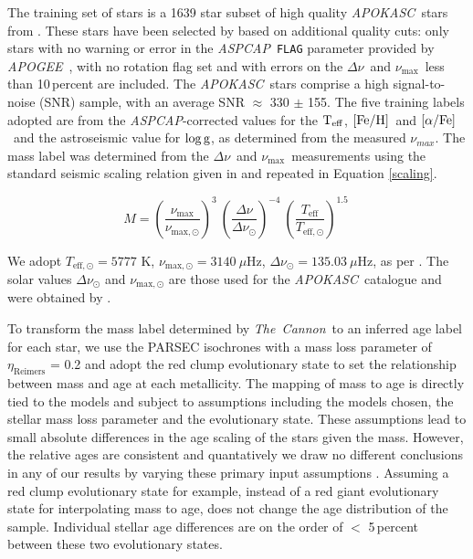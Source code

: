 \documentclass[12pt, preprint]{aastex}
\newcommand{\project}[1]{\textsl{#1}}
\newcommand{\tc}{\project{The~Cannon}}
\newcommand{\apogee}{\project{APOGEE}}
\newcommand{\apokasc}{\project{APOKASC}}
\newcommand{\aspcap}{\project{ASPCAP}}
\newcommand{\code}[1]{\texttt{#1}}
\newcommand{\teff}{\mbox{$\rm T_{eff}$}}
\newcommand{\feh}{\mbox{$\rm [Fe/H]$}}
\newcommand{\alphafe}{\mbox{$\rm [\alpha/Fe]$}}
\newcommand{\logg}{\mbox{$\rm \log g$}}
\newcommand{\numax}{$\nu_{\max}$}
\newcommand{\deltanu}{$\Delta\nu$}
\begin{document}
The training set of stars is a 1639 star subset of high quality \apokasc\ stars from \citet{Martig2014}. These stars have been selected by \citet{Martig2014} based on additional quality cuts: only stars with no warning or error in the \aspcap\ \code{FLAG} parameter provided by \apogee\ \citep{Ahn2014}, with no rotation flag set and with errors on the \deltanu\ and \numax\ less than 10\,percent are included. The \apokasc\ stars comprise a high signal-to-noise (SNR) sample, with an average SNR $\approx$ 330 $\pm$ 155. 
%
 The five training labels adopted are from the \aspcap-corrected \citep{Meszaros2013} values for the \teff, \feh\ and \alphafe\ and the astroseismic value for \logg, as determined from the measured $\nu_{max}$. The mass label was determined from the  \deltanu\ and \numax\ measurements using the standard seismic scaling relation given in \citet{SilvaA2011,Chaplin2011} and repeated in Equation \ref{scaling}.

\begin{equation} \label{eq:mass}
M= \left( \frac{\nu_{\mathrm{max}}}{\nu_{\mathrm{max,\odot}}}\right)^3\  \left( \frac{\Delta \nu}{\Delta \nu_{\odot}}\right)^{-4} \ \left( \frac{T_{\mathrm{eff}}}{T_{\mathrm{eff,\odot}}}\right)^{1.5} \ 
\end{equation}
\label{scaling}


We adopt  $T_{\mathrm{eff,\odot}}=5777$ K, $\nu_{\mathrm{max,\odot}}=3140\ \mu$Hz, $\Delta \nu_{\odot}=135.03\ \mu$Hz, as per \citet{Martig2014}. The solar values  $\Delta \nu_{\odot}$ and $\nu_{\mathrm{max,\odot}}$ are those used for the \apokasc\ catalogue and were obtained by \cite{Hekker2013}.

To transform the mass label determined by \tc\ to an inferred age label for each star, we use the PARSEC isochrones \citep{Bressan2012} with a mass loss parameter of $\eta_{\mbox{Reimers}}$ = 0.2 and adopt the red clump evolutionary state to set the relationship between mass and age at each metallicity.  The mapping of mass to age is directly tied to the models and subject to assumptions including the models chosen, the stellar mass loss parameter and the evolutionary state. These assumptions lead to small absolute differences in the age scaling of the stars given the mass. However,  the relative ages are consistent and quantatively we draw no different conclusions in any of our results by varying these primary input assumptions \citep[see also][]{Bovy2014}. Assuming a red clump evolutionary state for example, instead of a red giant evolutionary state for interpolating mass to age, does not change the age distribution of the sample. Individual stellar age differences are on the order of $<$ 5\,percent between these two evolutionary states. 
\end{document}
